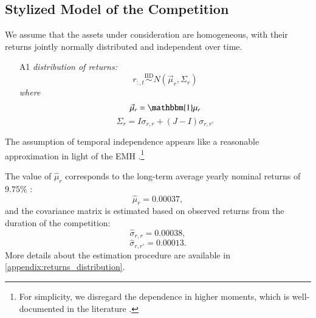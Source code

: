 \documentclass[3p,times,twocolumn]{elsarticle}
\begin{document}
\subsection{Stylized Model of the Competition}\label{subsection:stylized_model}

We assume that the assets under consideration are homogeneous, with their returns jointly normally distributed and independent over time.
\begin{itemize}
    \item[A1]  \emph{distribution of returns:}
        \begin{equation}
            r_{:,t} \overset{\mathrm{IID}}{\sim} N(\vec{\mu}_{r}, \Sigma_{r})
        \end{equation}
        \emph{where}
        \begin{equation}
            \vec{\mu}_{r}=\mathbbm{1}\mu_{r}
        \end{equation}
        \begin{equation}
            \Sigma_{r}=I\sigma_{r,r} + (J-I)\sigma_{r,r'}
        \end{equation}
\end{itemize}
The assumption of temporal independence appears like a reasonable approximation in light of the EMH \citep[see, e.g.,][]{malkielReflectionsEfficientMarket2005}.\footnote{For simplicity, we disregard the dependence in higher moments, which is well-documented in the literature \citep[see, e.g.,][]{dieboldModelingVolatilityDynamics1995}.}

The value of $\widehat{\mu}_{r}$ corresponds to the long-term average yearly nominal returns of $9.75\%$ \citep{webster500Returns19302023}:
\begin{equation}
    \widehat{\mu}_{r}=0.00037,
\end{equation}
and the covariance matrix is estimated based on observed returns from the duration of the competition:
\begin{equation}
    \widehat{\sigma}_{r,r}=0.00038,
\end{equation}
\begin{equation}
    \widehat{\sigma}_{r,r'}=0.00013.
\end{equation}
More details about the estimation procedure are available in \ref{appendix:returns_distribution}.
\end{document}
